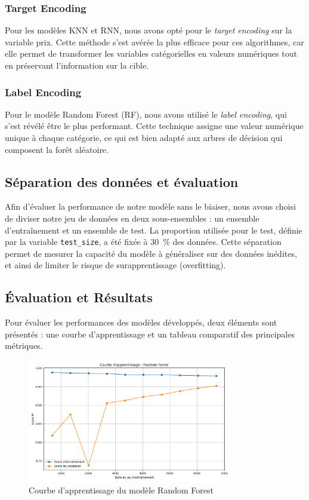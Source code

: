 \documentclass[12pt]{report}
\begin{document}
\subsubsection{Target Encoding}

Pour les modèles KNN et RNN, nous avons opté pour le \textit{target encoding} sur la variable prix. Cette méthode s'est avérée la plus efficace pour ces algorithmes, car elle permet de transformer les variables catégorielles en valeurs numériques tout en préservant l'information sur la cible.

\subsubsection{Label Encoding}

Pour le modèle Random Forest (RF), nous avons utilisé le \textit{label encoding}, qui s'est révélé être le plus performant. Cette technique assigne une valeur numérique unique à chaque catégorie, ce qui est bien adapté aux arbres de décision qui composent la forêt aléatoire.

\subsection{Séparation des données et évaluation} 

Afin d’évaluer la performance de notre modèle sans le biaiser, nous avons choisi de diviser notre jeu de données en deux sous-ensembles : un ensemble d’entraînement et un ensemble de test. La proportion utilisée pour le test, définie par la variable \texttt{test\_size}, a été fixée à 30~\% des données. Cette séparation permet de mesurer la capacité du modèle à généraliser sur des données inédites, et ainsi de limiter le risque de surapprentissage (overfitting).


\subsection{Évaluation et Résultats}


Pour évaluer les performances des modèles développés, deux éléments sont présentés : une courbe d'apprentissage et un tableau comparatif des principales métriques.

\begin{figure}[H]
    \centering
    \includegraphics[width=0.8\textwidth]{learning_curve_random_forest.png}
    \caption{Courbe d'apprentissage du modèle Random Forest}
\end{figure}
\end{document}
